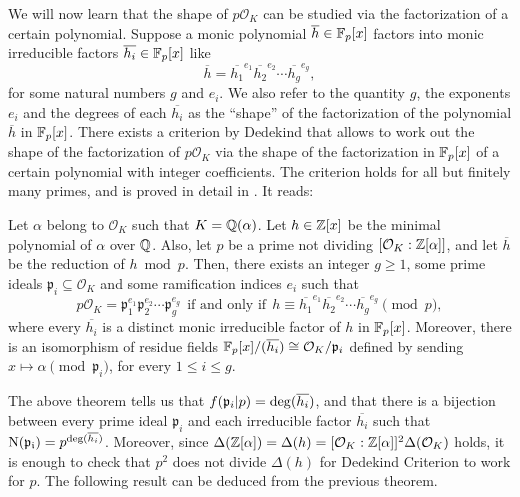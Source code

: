 \documentclass[../main.tex]{subfiles}
\begin{document}
 We will now learn that the shape of $p\mathcal{O}_K$ can be studied via the factorization of a certain polynomial. Suppose a monic polynomial $\overline{h}\in\mathbb{F}_p[x]$ factors into monic irreducible factors $\overline{h_i}\in\mathbb{F}_p[x]$ like 
\begin{equation*}
	\overline{h}=\overline{h_1}^{e_1}\overline{h_2}^{e_2}\cdots \overline{h_g}^{e_g},
\end{equation*}
for some natural numbers $g$ and $e_i$. We also refer to the quantity $g$, the exponents $e_i$ and the degrees of each $\overline{h_i}$ as the ``shape'' of the factorization of the polynomial $\overline{h}$ in $\mathbb{F}_p[x]$. There exists a criterion by Dedekind that allows to work out the shape of the factorization of $p\mathcal{O}_K$ via the shape of the factorization in $\mathbb{F}_p[x]$ of a certain polynomial with integer coefficients. The criterion holds for all but finitely many primes, and is proved in detail in \cite[Chapter 3]{Marcus}. It reads:
\begin{theorem}\label{th:criterionfactorization}
	Let $\alpha$ belong to $\mathcal{O}_K$ such that $K=\mathbb{Q}(\alpha)$. Let $h\in\mathbb{Z}[x]$ be the minimal polynomial of $\alpha$ over $\mathbb{Q}$. Also, let $p$ be a prime not dividing $[\mathcal{O}_K:\mathbb{Z}[\alpha]]$, and let $\overline{h}$ be the reduction of $h \bmod{p}$. Then, there exists an integer $g\geqslant 1$, some prime ideals $\mathfrak{p}_i\subseteq\mathcal{O}_K$ and some ramification indices $e_i$ such that
	\begin{equation*}
		p\mathcal{O}_K=\mathfrak{p}_1^{e_1}\mathfrak{p}_2^{e_2}\cdots\mathfrak{p}_g^{e_g} \ \ \text{if and only if} \ \ h\equiv \overline{h_1}^{e_1}\overline{h_2}^{e_2}\cdots \overline{h_g}^{e_g} \pmod{p},
	\end{equation*}
	where every $\overline{h_i}$ is a distinct monic irreducible factor of $h$ in $\mathbb{F}_p[x]$. Moreover, there is an isomorphism of residue fields $\mathbb{F}_p[x]/(\overline{h_i})\cong\mathcal{O}_K/\mathfrak{p}_i$ defined by sending $x\mapsto\alpha \pmod{\mathfrak{p}_i}$, for every $1\leqslant i \leqslant g$.
\end{theorem}
The above theorem tells us that $f(\mathfrak{p}_i|p)=\operatorname{deg}(\overline{h_i})$, and that there is a bijection between every prime ideal $\mathfrak{p}_i$ and each irreducible factor $\overline{h_i}$ such that $\operatorname{N}(\mathfrak{p_i})=p^{\operatorname{deg}(\overline{h_i})}$. Moreover, since $\Delta(\mathbb{Z}[\alpha])=\Delta(h)=[\mathcal{O}_K:\mathbb{Z}[\alpha]]^2\Delta(\mathcal{O}_K)$ holds, it is enough to check that $p^2$ does not divide $\Delta(h)$ for Dedekind Criterion to work for $p$. The following result can be deduced from the previous theorem.
\end{document}
